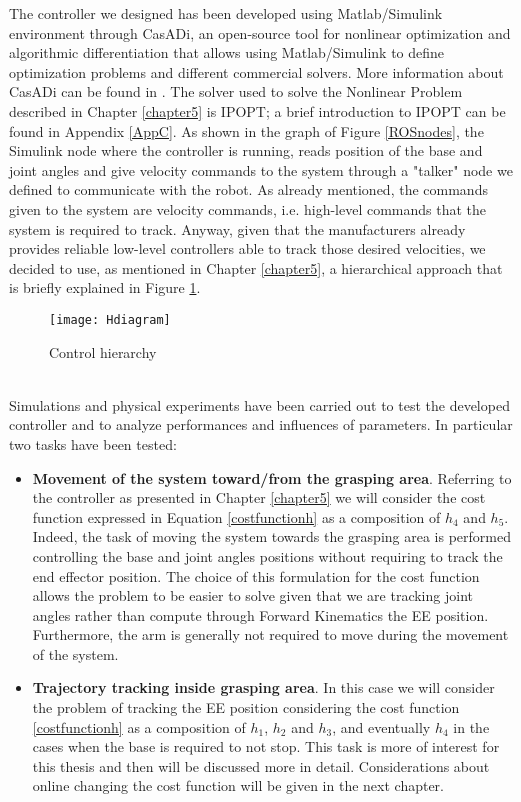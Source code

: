 The controller we designed has been developed using Matlab/Simulink environment through CasADi, an open-source tool for nonlinear optimization and algorithmic differentiation that allows using Matlab/Simulink to define optimization problems and different commercial solvers. More information about CasADi can be found in \cite{Andersson2018}. The solver used to solve the Nonlinear Problem described in Chapter \ref{chapter5} is IPOPT; a brief introduction to IPOPT can be found in Appendix \ref{AppC}. As shown in the graph of Figure \ref{ROSnodes}, the Simulink node where the controller is running, reads position of the base and joint angles and give velocity commands to the system through a "talker" node we defined to communicate with the robot. As already mentioned, the commands given to the system are velocity commands, i.e. high-level commands that the system is required to track. Anyway, given that the manufacturers already provides reliable low-level controllers able to track those desired velocities, we decided to use, as mentioned in Chapter \ref{chapter5}, a hierarchical approach that is briefly explained in Figure \ref{Hdiagram}.  
\begin{figure}[h!]

	\texttt{[image: Hdiagram]}
	\centering
	
	\caption{Control hierarchy} 

\label{Hdiagram}
\end{figure}
\\
Simulations and physical experiments have been carried out to test the developed controller and to analyze performances and influences of parameters. In particular two tasks have been tested: 

\begin{itemize}
\item \textbf{Movement of the system toward/from the grasping area}. Referring to the controller as presented in Chapter \ref{chapter5} we will consider the cost function expressed in Equation \ref{costfunctionh} as a composition of $h_4$ and $h_5$. Indeed, the task of moving the system towards the grasping area is performed controlling the base and joint angles positions without requiring to track the end effector position. The choice of this formulation for the cost function allows the problem to be easier to solve given that we are tracking joint angles rather than compute through Forward Kinematics the EE position. Furthermore, the arm is generally not required to move during the movement of the system.

\item \textbf{Trajectory tracking inside grasping area}. In this case we will consider the problem of tracking the EE position considering the cost function \ref{costfunctionh} as a composition of $h_1$, $h_2$ and $h_3$, and eventually $h_4$ in the cases when the base is required to not stop. This task is more of interest for this thesis and then will be discussed more in detail. Considerations about online changing the cost function will be given in the next chapter. 
\end{itemize}
